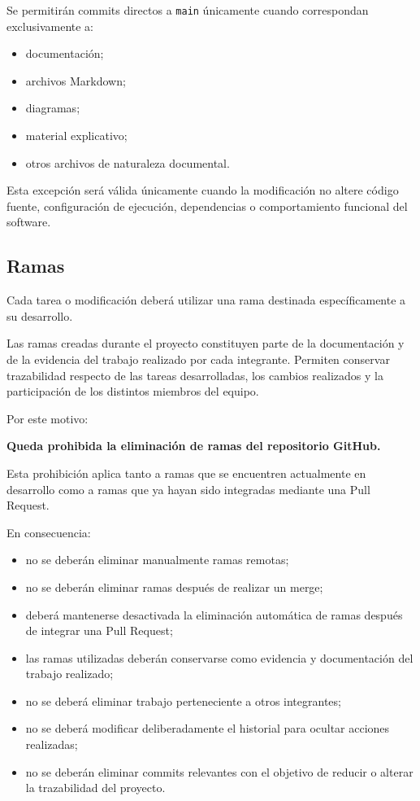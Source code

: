 \documentclass[12pt,a4paper]{article}
\begin{document}
Se permitirán commits directos a \texttt{main} únicamente cuando correspondan exclusivamente a:

\begin{itemize}
    \item documentación;
    \item archivos Markdown;
    \item diagramas;
    \item material explicativo;
    \item otros archivos de naturaleza documental.
\end{itemize}

Esta excepción será válida únicamente cuando la modificación no altere código fuente, configuración de ejecución, dependencias o comportamiento funcional del software.

\subsection{Ramas}

Cada tarea o modificación deberá utilizar una rama destinada específicamente a su desarrollo.

Las ramas creadas durante el proyecto constituyen parte de la documentación y de la evidencia del trabajo realizado por cada integrante. Permiten conservar trazabilidad respecto de las tareas desarrolladas, los cambios realizados y la participación de los distintos miembros del equipo.

Por este motivo:

\begin{center}
    \textbf{Queda prohibida la eliminación de ramas del repositorio GitHub.}
\end{center}

Esta prohibición aplica tanto a ramas que se encuentren actualmente en desarrollo como a ramas que ya hayan sido integradas mediante una Pull Request.

En consecuencia:

\begin{itemize}
    \item no se deberán eliminar manualmente ramas remotas;
    \item no se deberán eliminar ramas después de realizar un merge;
    \item deberá mantenerse desactivada la eliminación automática de ramas después de integrar una Pull Request;
    \item las ramas utilizadas deberán conservarse como evidencia y documentación del trabajo realizado;
    \item no se deberá eliminar trabajo perteneciente a otros integrantes;
    \item no se deberá modificar deliberadamente el historial para ocultar acciones realizadas;
    \item no se deberán eliminar commits relevantes con el objetivo de reducir o alterar la trazabilidad del proyecto.
\end{itemize}
\end{document}

